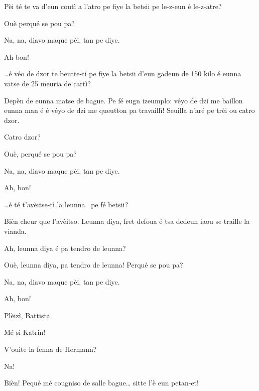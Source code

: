 \begin{drama}

\Battistaspeaks  {} Pèi té te va d’eun coutì a l’atro pe fiye la betsii pe le-z-eun é le-z-atre?

\Hermannspeaks {} Ouè perqué se pou pa?

\Battistaspeaks{}  Na, na, diavo maque pèi, tan pe diye.

\Hermannspeaks Ah bon!

\Battistaspeaks  {} \ldots é véo de dzor te beutte-tì pe fiye la betsii d’eun gadeun de 150 kilo é eunna vatse de 25 meuria de cartì?

\Hermannspeaks Depèn de eunna matse de bague. Pe fé eugn izeumplo: véyo de dzi me baillon eunna man é  é véyo de dzi me queutton pa travaillì! Seuilla n'aré pe trèi ou catro dzor.

\Battistaspeaks  Catro dzor?

\Hermannspeaks{} Ouè, perqué se pou pa?

\Battistaspeaks{}  Na, na, diavo maque pèi, tan pe diye.

\Hermannspeaks Ah, bon!

\Battistaspeaks{}\ldots é té t’avèitse-tì la leunna \luna\ pe fé be\-tsii?

\Hermannspeaks Bièn cheur que l’avèitso. Leunna diya, fret defoua é tsa dedeun iaou se traille la vianda. 

\Battistaspeaks Ah, leunna diya é pa tendro de leunna?

\Hermannspeaks {} Ouè, leunna diya, pa tendro de leunna! Perqué se pou pa?

\Battistaspeaks{}  Na, na, diavo maque pèi, tan pe diye.

\Hermannspeaks Ah, bon!


\Battistaspeaks{} Plèizì, Battista.

\Katrinspeaks{} Mé si Katrin!

\Battistaspeaks  V'ouite la fenna de Hermann?

\Katrinspeaks  Na!

\Battistaspeaks  Bièn! Pequé mé cougniso de salle bague\ldots {} sitte l’è eun petan-et!


\end{drama}
